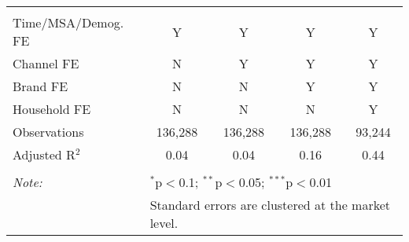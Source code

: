 \begin{table}[!htbp]
\begin{tabular}{@{\extracolsep{5pt}}lcccc}
 \hline \\[-1.8ex] 
Time/MSA/Demog. FE & Y & Y & Y & Y \\ 
Channel FE & N & Y & Y & Y \\ 
Brand FE & N & N & Y & Y \\ 
Household FE & N & N & N & Y \\ 
Observations & 136,288 & 136,288 & 136,288 & 93,244 \\ 
Adjusted R$^{2}$ & 0.04 & 0.04 & 0.16 & 0.44 \\ 
\hline 
\hline \\[-1.8ex] 
\textit{Note:}  & \multicolumn{4}{l}{$^{*}$p$<$0.1; $^{**}$p$<$0.05; $^{***}$p$<$0.01} \\ 
 & \multicolumn{4}{l}{Standard errors are clustered at the market level.} \\ 
\end{tabular} 
\end{table} 
